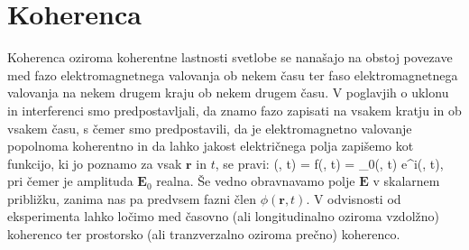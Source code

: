 
\chapter{Koherenca}
\label{chap:Koherenca}
Koherenca oziroma koherentne lastnosti svetlobe se nanašajo na obstoj povezave
med fazo elektromagnetnega valovanja ob nekem času ter faso elektromagnetnega
valovanja na nekem drugem kraju ob nekem drugem času. V poglavjih o uklonu in interferenci
smo predpostavljali, da znamo fazo zapisati na vsakem kratju in ob vsakem času,
s čemer smo predpostavili, da je elektromagnetno valovanje popolnoma koherentno
in da lahko jakost električnega polja zapišemo kot funkcijo, ki jo poznamo
za vsak $\mathbf{r}$ in $t$, se pravi:
\beq
{} (, t) = f(, t) = _0(, t) e^{i\phi(, t)}, 
\eeq
pri čemer je amplituda $\mathbf{E}_0$ realna. Še vedno obravnavamo polje $\mathbf{E}$
v skalarnem približku, zanima nas pa predvsem fazni člen $\phi(\mathbf{r}, t)$. V odvisnosti
od eksperimenta lahko ločimo med časovno (ali longitudinalno oziroma vzdolžno) koherenco ter
prostorsko (ali tranzverzalno oziroma prečno) koherenco.

